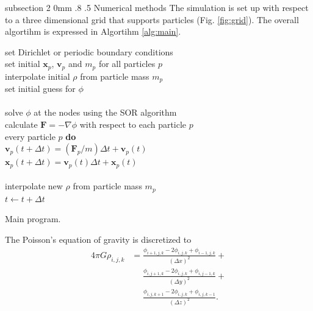 \documentclass[notitlepage, 12pt]{article}
\makeatletter
\renewcommand{\subsection}{\@startsection    %
        {subsection}
        {2}
        {0mm}
        {.8\baselineskip}
        {.5\baselineskip}
        {\bfseries\normalsize}}
\makeatother
\begin{document}
\subsection{Numerical methods}\label{ssec:numerical}
The simulation is set up with respect to a three dimensional grid that supports particles (Fig. \ref{fig:grid}).
The overall algortihm is expressed in Algortihm \ref{alg:main}.
\begin{algorithm}[H]
\hspace{0.1\textwidth}\parbox{.8\textwidth}{
\-\hspace{0ex}set Dirichlet or periodic boundary conditions\\
\-\hspace{0ex}set initial $\mathbf{x}_p$, $\mathbf{v}_p$ and $m_p$ for all particles $p$\\
\-\hspace{0ex}interpolate initial $\rho$ from particle mass $m_p$\\
\-\hspace{0ex}set initial guess for $\phi$\\
\-\hspace{0ex}{\bf loop}\\
\-\hspace{4ex}solve $\phi$ at the nodes using the SOR algorithm\\
\-\hspace{4ex}calculate $\mathbf{F}=-\nabla \phi$ with respect to each particle $p$\\
\-\hspace{4ex}{\bf for} every particle $p$ {\bf do}\\
\-\hspace{8ex}$\mathbf{v}_p(t+\Delta t) = (\mathbf{F}_p/m)\Delta t + \mathbf{v}_p(t)$\\
\-\hspace{8ex}$\mathbf{x}_p(t+\Delta t) = \mathbf{v}_p(t)\Delta t + \mathbf{x}_p(t)$\\
\-\hspace{4ex}{\bf end for}\\
\-\hspace{4ex}interpolate new $\rho$ from particle mass $m_p$\\
\-\hspace{4ex}$t\leftarrow t+\Delta t$\\
\-\hspace{0ex}{\bf end loop}}
\caption{Main program.}
\label{alg:main}
\end{algorithm}

The Poisson's equation of gravity is discretized to 
\begin{equation} \label{eq:discretized_poisson}
\begin{aligned}
4\pi G\rho_{i,j,k} &= \frac{\phi_{i+1,j,k}-2\phi_{i,j,k}+\phi_{i-1,j,k}}{(\Delta x)^2}+\\
& \phantom{{}={}} \frac{\phi_{i,j+1,k}-2\phi_{i,j,k}+\phi_{i,j-1,k}}{(\Delta y)^2}+\\
& \phantom{{}={}} \frac{\phi_{i,j,k+1}-2\phi_{i,j,k}+\phi_{i,j,k-1}}{(\Delta z)^2}.
\end{aligned}
\end{equation}
\end{document}
